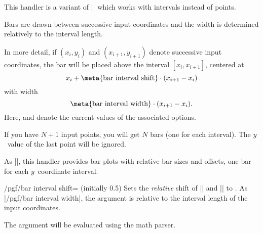 \begin{command}{\pgfplothandlerybarinterval}
  This handler is a variant of |\pgfplothandlerybar| which works with
  intervals instead of points. 
  
  Bars are drawn between successive input coordinates and the width is
  determined relatively to the interval length. 
  
\begin{codeexample}[]
\end{codeexample}

In more detail, if $(x_i,y_i)$ and $(x_{i+1},y_{i+1})$ denote
successive input coordinates, the bar will be placed above the
interval $[x_i,x_{i+1}]$, centered at \[ x_i + \text{\meta{bar
    interval shift}} \cdot (x_{i+1} - x_i) \] with width \[
\text{\meta{bar interval width}} \cdot (x_{i+1} - x_i). \] Here,
 and  denote the
current values of the associated options. 

If you have $N+1$ input points, you will get $N$ bars (one for each
interval). The $y$~value of the last point will be ignored. 
\end{command}

\begin{command}{\pgfplothandlerxbarinterval}
   As |\pgfplothandlerybarinterval|, this handler provides bar plots
   with relative bar sizes and offsets, one bar for each
   $y$~coordinate interval. 
\end{command}

\label{key-bar-interval-shift}%
\begin{key}{/pgf/bar interval shift= (initially 0.5)}
  Sets the \emph{relative} shift of |\pgfplothandlerxbarinterval| and
  |\pgfplothandlerybarinterval| to . As
  |/pgf/bar interval width|, the argument is relative to the interval
  length of the input coordinates. 
	
  The argument  will be evaluated using the math parser.
\end{key}

